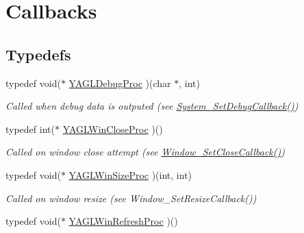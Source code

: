 \hypertarget{group____callbacks}{\section{Callbacks}
\label{group____callbacks}
}
\subsection*{Typedefs}
\begin{DoxyCompactItemize}
\item 
typedef void($\ast$ \hyperlink{group____callbacks_ga7ae123bcbd5a4a7fb48b73bb9ebd04bc}{Y\-A\-G\-L\-Debug\-Proc} )(char $\ast$, int)
\begin{DoxyCompactList}\small\item\em Called when debug data is outputed (see \hyperlink{group____system_gacf99e83f1f621c84c147e7f99f707cf4}{System\-\_\-\-Set\-Debug\-Callback()}) \end{DoxyCompactList}\item 
typedef int($\ast$ \hyperlink{group____callbacks_ga75b61763676e4aa7c18f0956518bf740}{Y\-A\-G\-L\-Win\-Close\-Proc} )()
\begin{DoxyCompactList}\small\item\em Called on window close attempt (see \hyperlink{group____window_gabe87127a4dd79764ef3308efe50eb6ea}{Window\-\_\-\-Set\-Close\-Callback()}) \end{DoxyCompactList}\item 
typedef void($\ast$ \hyperlink{group____callbacks_ga60792a830ce0db49f34dc6b05af814e8}{Y\-A\-G\-L\-Win\-Size\-Proc} )(int, int)
\begin{DoxyCompactList}\small\item\em Called on window resize (see Window\-\_\-\-Set\-Resize\-Callback()) \end{DoxyCompactList}\item 
\hypertarget{group____callbacks_gab7e009655f4d5cc624a69e1025b2460d}{typedef void($\ast$ \hyperlink{group____callbacks_gab7e009655f4d5cc624a69e1025b2460d}{Y\-A\-G\-L\-Win\-Refresh\-Proc} )()}\label{group____callbacks_gab7e009655f4d5cc624a69e1025b2460d}


\end{DoxyCompactItemize}
